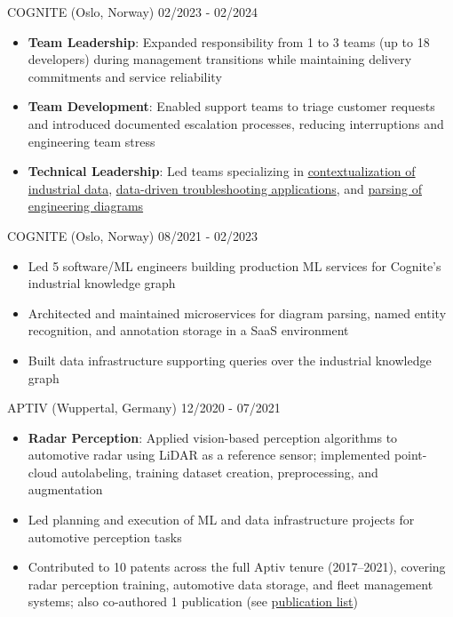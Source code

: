 \documentclass[singlesided,
               paper=a4,
               fontsize=10pt
              ]{my-resume}
\begin{document}
%
	{COGNITE (Oslo, Norway)}
	{02/2023 - 02/2024}
    {
        \begin{itemize}[leftmargin=2em]
            \item \textbf{Team Leadership}: Expanded responsibility from 1 to 3 teams (up to 18 developers) during management transitions while maintaining delivery commitments and service reliability
            \item \textbf{Team Development}: Enabled support teams to triage customer requests and introduced documented escalation processes, reducing interruptions and engineering team stress
            \item \textbf{Technical Leadership}: Led teams specializing in \href{https://www.cognite.com/en/contextualization}{contextualization of industrial data}, \href{https://www.cognite.com/en/industrial-canvas}{data-driven troubleshooting applications}, and \href{https://docs.cognite.com/cdf/integration/guides/contextualization/interactive_diagrams/}{parsing of engineering diagrams}
        \end{itemize}
    }
%
	{COGNITE (Oslo, Norway)}
	{08/2021 - 02/2023}
    {
        \begin{itemize}[leftmargin=2em]
            \item Led 5 software/ML engineers building production ML services for Cognite's industrial knowledge graph
            \item Architected and maintained microservices for diagram parsing, named entity recognition, and annotation storage in a SaaS environment
            \item Built data infrastructure supporting queries over the industrial knowledge graph
        \end{itemize}
    }
%
    {APTIV (Wuppertal, Germany)}
    {12/2020 - 07/2021}
    {
        \begin{itemize}[leftmargin=2em]
            \item \textbf{Radar Perception}: Applied vision-based perception algorithms to automotive radar using LiDAR as a reference sensor; implemented point-cloud autolabeling, training dataset creation, preprocessing, and augmentation
            \item Led planning and execution of ML and data infrastructure projects for automotive perception tasks
            \item Contributed to 10 patents across the full Aptiv tenure (2017--2021), covering radar perception training, automotive data storage, and fleet management systems; also co-authored 1 publication (see \href{https://scholar.google.com/citations?hl=de&user=MnU8ZxwAAAAJ}{publication list})
        \end{itemize}
    }
\end{document}
